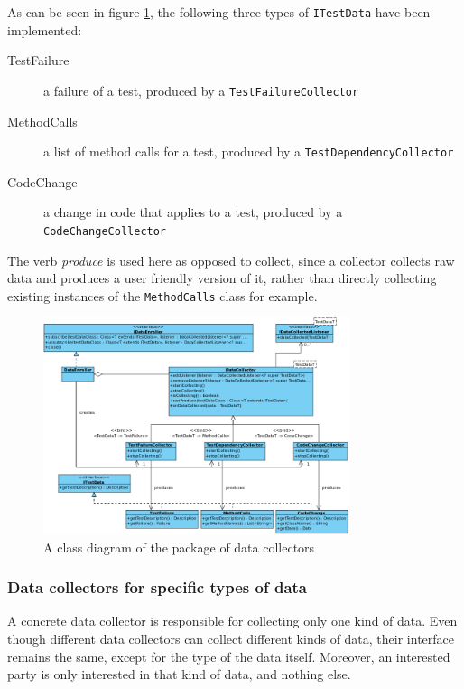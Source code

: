 \documentclass[i2]{oss}
\newcommand{\class}[1]{\texttt{#1}}
\begin{document}
As can be seen in figure \ref{fig:diagram:collectors}, the following three types of \class{ITestData} have been implemented:
\begin{description}
\item[TestFailure] a failure of a test, produced by a \class{TestFailureCollector}
\item[MethodCalls] a list of method calls for a test, produced by a \class{TestDependencyCollector}
\item[CodeChange] a change in code that applies to a test, produced by a \class{CodeChangeCollector}
\end{description}
The verb \emph{produce} is used here as opposed to collect, since a collector collects raw data and produces a user friendly version of it, rather than directly collecting existing instances of the \class{MethodCalls} class for example.

\begin{figure}[tbp]
\begin{center}
    \includegraphics[width=0.8\textwidth]{DataCollectors}
    \caption{A class diagram of the package of data collectors}
	\label{fig:diagram:collectors}
\end{center}
\end{figure}

\subsubsection{Data collectors for specific types of data}

A concrete data collector is responsible for collecting only one kind of data.
Even though different data collectors can collect different kinds of data, their interface remains the same, except for the type of the data itself. 
Moreover, an interested party is only interested in that kind of data, and nothing else.
\end{document}
